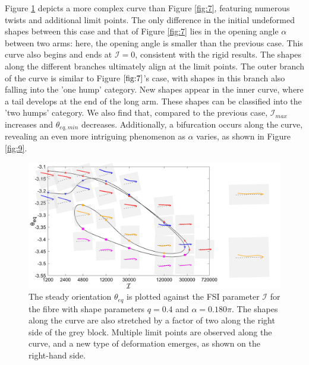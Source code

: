 \documentclass[lineno]{JFM-FLM_Au}
\begin{document}
Figure \ref{fig:8} depicts a more complex curve than Figure \ref{fig:7}, featuring numerous twists and additional limit points. The only difference in the initial undeformed shapes between this case and that of Figure \ref{fig:7} lies in the opening angle $\alpha$ between two arms: here, the opening angle is smaller than the previous case. This curve also begins and ends at $\mathcal{I}=0$, consistent with the rigid results. The shapes along the different branches ultimately align at the limit points. The outer branch of the curve is similar to Figure $\ref{fig:7}$'s case, with shapes in this branch also falling into the 'one hump' category. New shapes appear in the inner curve, where a tail develops at the end of the long arm. These shapes can be classified into the 'two humps' category. We also find that, compared to the previous case, $\mathcal{I}_{max}$ increases and $\theta_{eq,min}$ decreases. Additionally, a bifurcation occurs along the curve, revealing an even more intriguing phenomenon as $\alpha$ varies, as shown in Figure \ref{fig:9}.
\begin{figure}[!h]
	\begin{center}
		\includegraphics[width=1\textwidth]{plot/RESLT_q_0.40_alpha_0.180pi_plot_step_refine2_new_recale_FSI/combine_elastic_beam_I_theta_q_0.400_alpha_0.180pi_initial_-4.80_refine2_rescale_FSI.png}
		\caption{The steady orientation $\theta_{eq}$ is plotted against the FSI parameter $\mathcal{I}$ for the fibre with shape parameters $q = 0.4$ and $\alpha = 0.180\pi$. The shapes along the curve are also stretched by a factor of two along the right side of the grey block. Multiple limit points are observed along the curve, and a new type of deformation emerges, as shown on the right-hand side.}
		\label{fig:8}
	\end{center}
\end{figure}
\end{document}
